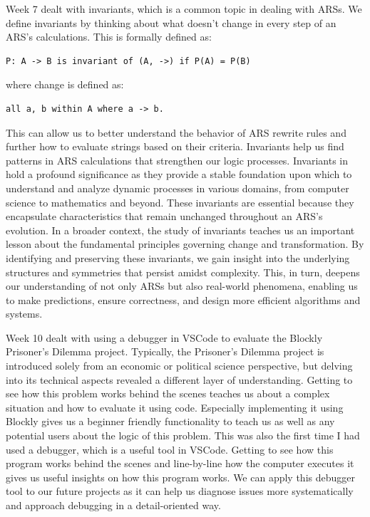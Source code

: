\documentclass{article}
\theoremstyle{theorem}
\theoremstyle{definition}
\theoremstyle{remark}
\begin{document}
Week 7 dealt with invariants, which is a common topic in dealing with ARSs. We define invariants by thinking about what doesn't change in every step of an ARS's calculations. This is formally defined as: 
\begin{lstlisting}
P: A -> B is invariant of (A, ->) if P(A) = P(B) 
\end{lstlisting}
where change is defined as: 
\begin{lstlisting}
all a, b within A where a -> b.
\end{lstlisting}
This can allow us to better understand the behavior of ARS rewrite rules and further how to evaluate strings based on their criteria. Invariants help us find patterns in ARS  calculations that strengthen our logic processes. Invariants in hold a profound significance as they provide a stable foundation upon which to understand and analyze dynamic processes in various domains, from computer science to mathematics and beyond. These invariants are essential because they encapsulate characteristics that remain unchanged throughout an ARS's evolution. In a broader context, the study of invariants teaches us an important lesson about the fundamental principles governing change and transformation. By identifying and preserving these invariants, we gain insight into the underlying structures and symmetries that persist amidst complexity. This, in turn, deepens our understanding of not only ARSs but also real-world phenomena, enabling us to make predictions, ensure correctness, and design more efficient algorithms and systems. 

Week 10 dealt with using a debugger in VSCode to evaluate the Blockly Prisoner's Dilemma project. Typically, the Prisoner's Dilemma project is introduced solely from an economic or political science perspective, but delving into its technical aspects revealed a different layer of understanding. Getting to see how this problem works behind the scenes teaches us about a complex situation and how to evaluate it using code. Especially implementing it using Blockly gives us a beginner friendly functionality to teach us as well as any potential users about the logic of this problem. This was also the first time I had used a debugger, which is a useful tool in VSCode. Getting to see how this program works behind the scenes and line-by-line how the computer executes it gives us useful insights on how this program works. We can apply this debugger tool to our future projects as it can help us diagnose issues more systematically and approach debugging in a detail-oriented way.
\end{document}
